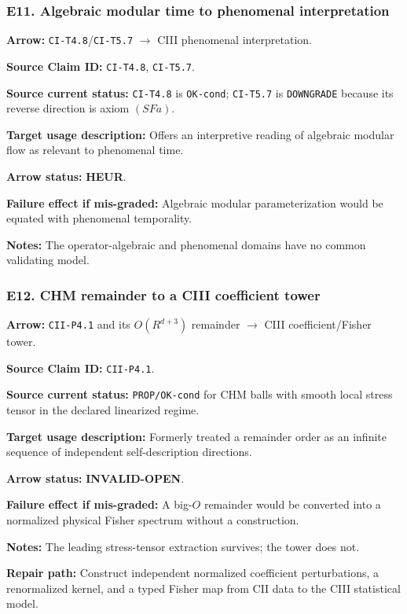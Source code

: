 \documentclass[12pt,a4paper]{article}
\begin{document}
\subsubsection*{E11. Algebraic modular time to phenomenal interpretation}
\noindent\textbf{Arrow:} \texttt{CI-T4.8}/\texttt{CI-T5.7}
\(\to\) CIII phenomenal interpretation.\par
\noindent\textbf{Source Claim ID:} \texttt{CI-T4.8},
\texttt{CI-T5.7}.\par
\noindent\textbf{Source current status:} \texttt{CI-T4.8} is
\texttt{OK-cond}; \texttt{CI-T5.7} is \texttt{DOWNGRADE} because its
reverse direction is axiom \((SFa)\).\par
\noindent\textbf{Target usage description:} Offers an interpretive
reading of algebraic modular flow as relevant to phenomenal time.\par
\noindent\textbf{Arrow status:} \textbf{HEUR}.\par
\noindent\textbf{Failure effect if mis-graded:} Algebraic modular
parameterization would be equated with phenomenal temporality.\par
\noindent\textbf{Notes:} The operator-algebraic and phenomenal domains
have no common validating model.\par

\subsubsection*{E12. CHM remainder to a CIII coefficient tower}
\noindent\textbf{Arrow:} \texttt{CII-P4.1} and its
\(O(R^{d+3})\) remainder \(\to\) CIII coefficient/Fisher tower.\par
\noindent\textbf{Source Claim ID:} \texttt{CII-P4.1}.\par
\noindent\textbf{Source current status:} \texttt{PROP/OK-cond} for CHM
balls with smooth local stress tensor in the declared linearized regime.\par
\noindent\textbf{Target usage description:} Formerly treated a remainder
order as an infinite sequence of independent self-description
directions.\par
\noindent\textbf{Arrow status:} \textbf{INVALID-OPEN}.\par
\noindent\textbf{Failure effect if mis-graded:} A big-\(O\) remainder
would be converted into a normalized physical Fisher spectrum without a
construction.\par
\noindent\textbf{Notes:} The leading stress-tensor extraction survives;
the tower does not.\par
\noindent\textbf{Repair path:} Construct independent normalized
coefficient perturbations, a renormalized kernel, and a typed Fisher map
from CII data to the CIII statistical model.\par
\end{document}
